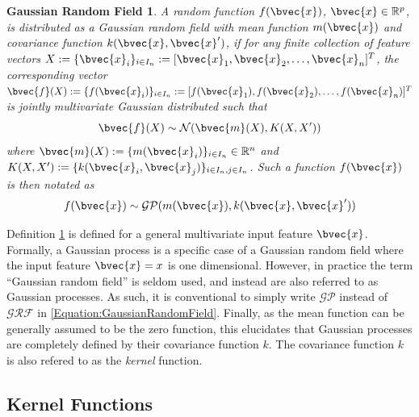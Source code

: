 			\newtheorem{grfdef}{Gaussian Random Field}[section]
			\begin{grfdef}
				A random function $f(\bvec{x})$, $\bvec{x} \in \mathbb{R}^{p}$, is distributed as a Gaussian random field with mean function $m(\bvec{x})$ and covariance function $k(\bvec{x}, \bvec{x}')$, if for any finite collection of feature vectors $X := \{\bvec{x}_{i}\}_{i \in I_{n}} := [\bvec{x}_{1}, \bvec{x}_{2}, \dots, \bvec{x}_{n}]^{T}$, the corresponding vector $\bvec{f}(X) := \{f(\bvec{x}_{i})\}_{i \in I_{n}} := [f(\bvec{x}_{1}), f(\bvec{x}_{2}), \dots, f(\bvec{x}_{n})]^{T}$ is jointly multivariate Gaussian distributed such that \begin{equation}
						\bvec{f}(X) \sim \mathcal{N}(\bvec{m}(X), K(X, X'))
					\label{Equation:GaussianRandomFieldFiniteDistribution}
					\end{equation} where $\bvec{m}(X) :=  \{m(\bvec{x}_{i})\}_{i \in I_{n}} \in \mathbb{R}^{n}$ and $K(X, X') := \{k(\bvec{x}_{i}, \bvec{x}_{j})\}_{i \in I_{n}, j \in I_{n}}$. Such a function $f(\bvec{x})$ is then notated as \begin{equation}
						f(\bvec{x}) \sim \mathcal{GP}(m(\bvec{x}), k(\bvec{x}, \bvec{x}'))
					\label{Equation:GaussianRandomField}
					\end{equation}	
					
			\label{Definition:GaussianRandomField}
			\end{grfdef} Definition \ref{Definition:GaussianRandomField} is defined for a general multivariate input feature $\bvec{x}$. Formally, a Gaussian process is a specific case of a Gaussian random field where the input feature $\bvec{x} = x$ is one dimensional. However, in practice the term ``Gaussian random field'' is seldom used, and instead are also referred to as Gaussian processes. As such, it is conventional to simply write $\mathcal{GP}$ instead of $\mathcal{GRF}$ in \eqref{Equation:GaussianRandomField}. Finally, as the mean function can be generally assumed to be the zero function, this elucidates that Gaussian processes are completely defined by their covariance function $k$. The covariance function $k$ is also refered to as the \textit{kernel} function.
			
			
		\subsection{Kernel Functions}
		\label{Background:GaussianProcesses:KernelFunctions}

